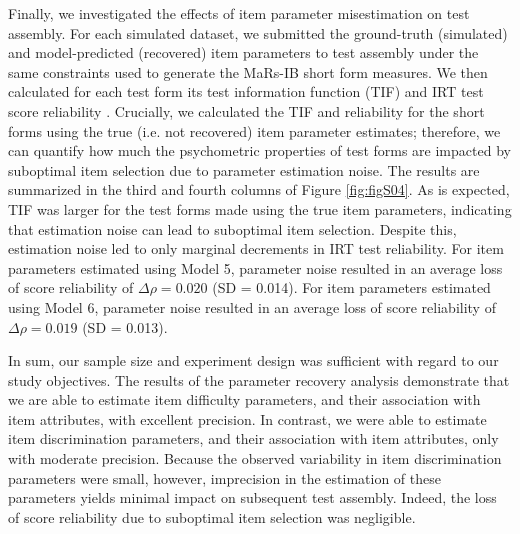 \documentclass[a4paper,man,natbib]{apa6}
\begin{document}
Finally, we investigated the effects of item parameter misestimation on test assembly. For each simulated dataset, we submitted the ground-truth (simulated) and model-predicted (recovered) item parameters to test assembly under the same constraints used to generate the MaRs-IB short form measures. We then calculated for each test form its test information function (TIF) and IRT test score reliability \cite{kim2010estimation, nicewander2018conditional}. Crucially, we calculated the TIF and reliability for the short forms using the true (i.e. not recovered) item parameter estimates; therefore, we can quantify how much the psychometric properties of test forms are impacted by suboptimal item selection due to parameter estimation noise. The results are summarized in the third and fourth columns of Figure \ref{fig:figS04}. As is expected, TIF was larger for the test forms made using the true item parameters, indicating that estimation noise can lead to suboptimal item selection. Despite this, estimation noise led to only marginal decrements in IRT test reliability. For item parameters estimated using Model 5, parameter noise resulted in an average loss of score reliability of $\Delta \rho = 0.020$ (SD = 0.014). For item parameters estimated using Model 6, parameter noise resulted in an average loss of score reliability of $\Delta \rho = 0.019$ (SD = 0.013). 

In sum, our sample size and experiment design was sufficient with regard to our study objectives. The results of the parameter recovery analysis demonstrate that we are able to estimate item difficulty parameters, and their association with item attributes, with excellent precision. In contrast, we were able to estimate item discrimination parameters, and their association with item attributes, only with moderate precision. Because the observed variability in item discrimination parameters were small, however, imprecision in the estimation of these parameters yields minimal impact on subsequent test assembly. Indeed, the loss of score reliability due to suboptimal item selection was negligible. 


\end{document}
